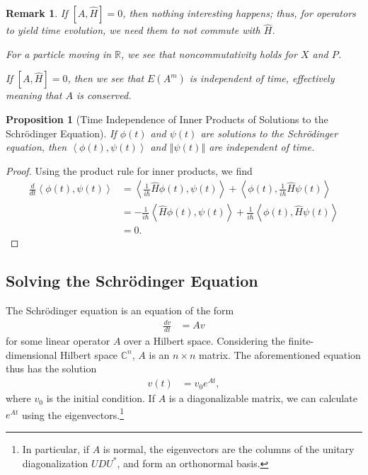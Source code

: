 \documentclass[12pt]{extarticle}
\newtheorem*{remark}{Remark}
\newcommand{\R}{\mathbb{R}}
\newcommand{\C}{\mathbb{C}}
\newcommand{\iprod}[2]{\left\langle #1,#2\right\rangle}
\newcommand{\norm}[1]{\left\Vert #1\right\Vert}
\theoremstyle{plain}
\newtheorem*{proposition}{Proposition}%
\theoremstyle{definition}
\theoremstyle{remark}
\renewcommand{\newline}{\hfill\break}
\begin{document}
  \begin{remark}
    If $[A,\hat{H}] = 0$, then nothing interesting happens; thus, for operators to yield time evolution, we need them to \textit{not} commute with $\hat{H}$.\newline

    For a particle moving in $\R$, we see that noncommutativity holds for $X$ and $P$.\newline

    If $[A,\hat{H}] = 0$, then we see that $E(A^{m})$ is independent of time, effectively meaning that $A$ is conserved.
  \end{remark}
  \begin{proposition}[Time Independence of Inner Products of Solutions to the Schrödinger Equation]
    If $\phi(t)$ and $\psi(t)$ are solutions to the Schrödinger equation, then $\iprod{\phi(t)}{\psi(t)}$ and $\norm{\psi(t)}$ are independent of time.
  \end{proposition}
  \begin{proof}
    Using the product rule for inner products, we find
    \begin{align*}
      \frac{d}{dt}\iprod{\phi(t)}{\psi(t)} &= \iprod{\frac{1}{i\hbar}\hat{H}\phi(t)}{\psi(t)} + \iprod{\phi(t)}{\frac{1}{i\hbar}\hat{H}\psi(t)}\\
                                           &= -\frac{1}{i\hbar}\iprod{\hat{H}\phi(t)}{\psi(t)} + \frac{1}{i\hbar}\iprod{\phi(t)}{\hat{H}\psi(t)}\\
                                           &= 0.
    \end{align*}
  \end{proof}
  \subsection{Solving the Schrödinger Equation}%
  The Schrödinger equation is an equation of the form
  \begin{align*}
    \frac{dv}{dt} &= Av
  \end{align*}
  for some linear operator $A$ over a Hilbert space. Considering the finite-dimensional Hilbert space $\C^{n}$, $A$ is an $n\times n$ matrix. The aforementioned equation thus has the solution
  \begin{align*}
    v(t) &= v_0e^{At},
  \end{align*}
  where $v_0$ is the initial condition. If $A$ is a diagonalizable matrix, we can calculate $e^{At}$ using the eigenvectors.\footnote{In particular, if $A$ is normal, the eigenvectors are the columns of the unitary diagonalization $UDU^{\ast}$, and form an orthonormal basis.}\newline
\end{document}

